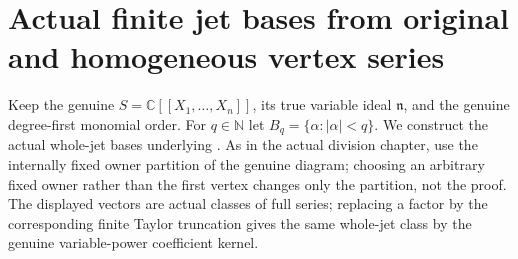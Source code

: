 \section{Actual finite jet bases from original and homogeneous vertex series}

Keep the genuine $S=\mathbb C[[X_1,\ldots,X_n]]$, its true variable
ideal $\mathfrak n$, and the genuine degree-first monomial order.
For $q\in\mathbb N$ let $B_q=\{\alpha:|\alpha|<q\}$.
We construct the actual whole-jet bases underlying
\cite[Lemma~7.7(a),(b), pp.~263--264]{bierstone-milman97-invent-math}.
As in the actual division chapter, use the internally fixed owner
partition of the genuine diagram; choosing an arbitrary fixed owner
rather than the first vertex changes only the partition, not the proof.
The displayed vectors are actual classes of full series; replacing a
factor by the corresponding finite Taylor truncation gives the same
whole-jet class by the genuine variable-power coefficient kernel.

